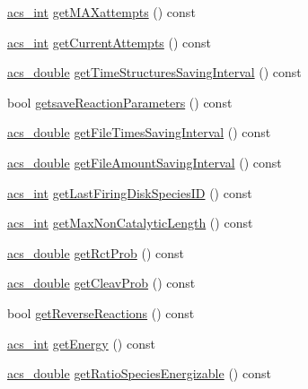 \begin{DoxyCompactItemize}
\item 
\hyperlink{a00024_a8d277355641a098190360234e2ebde35}{acs\-\_\-int} \hyperlink{a00011_ae626b961a53eeb5e08b4190da235e8dd}{get\-M\-A\-Xattempts} () const 
\item 
\hyperlink{a00024_a8d277355641a098190360234e2ebde35}{acs\-\_\-int} \hyperlink{a00011_a0851e3481e6fec7f4feef126d5a6704c}{get\-Current\-Attempts} () const 
\item 
\hyperlink{a00024_ab776853a005fcbf56af0424a2a4dd607}{acs\-\_\-double} \hyperlink{a00011_a892dd7bd29342c4206c39556d91a83da}{get\-Time\-Structures\-Saving\-Interval} () const 
\item 
bool \hyperlink{a00011_a19f10c43e263fbc167bbd4cc760c92ff}{getsave\-Reaction\-Parameters} () const 
\item 
\hyperlink{a00024_ab776853a005fcbf56af0424a2a4dd607}{acs\-\_\-double} \hyperlink{a00011_a77e995bee54ab4e09f165a857a7b0272}{get\-File\-Times\-Saving\-Interval} () const 
\item 
\hyperlink{a00024_ab776853a005fcbf56af0424a2a4dd607}{acs\-\_\-double} \hyperlink{a00011_adf74cb3545d95a7965e3a18cfc98cebe}{get\-File\-Amount\-Saving\-Interval} () const 
\item 
\hyperlink{a00024_a8d277355641a098190360234e2ebde35}{acs\-\_\-int} \hyperlink{a00011_a984f79e5f89b774b65db901899687ac0}{get\-Last\-Firing\-Disk\-Species\-I\-D} () const 
\item 
\hyperlink{a00024_a8d277355641a098190360234e2ebde35}{acs\-\_\-int} \hyperlink{a00011_aca760caf9354f541020c1db58490b18f}{get\-Max\-Non\-Catalytic\-Length} () const 
\item 
\hyperlink{a00024_ab776853a005fcbf56af0424a2a4dd607}{acs\-\_\-double} \hyperlink{a00011_ae244aa972cf10c103b8b20d95703831f}{get\-Rct\-Prob} () const 
\item 
\hyperlink{a00024_ab776853a005fcbf56af0424a2a4dd607}{acs\-\_\-double} \hyperlink{a00011_ac728f6ab012c42fa85a2e2f70df7dc58}{get\-Cleav\-Prob} () const 
\item 
bool \hyperlink{a00011_a2a2ac2a8140df67688a71d3349adf04a}{get\-Reverse\-Reactions} () const 
\item 
\hyperlink{a00024_a8d277355641a098190360234e2ebde35}{acs\-\_\-int} \hyperlink{a00011_ab463a460de102c79c1044ab8a2c176ae}{get\-Energy} () const 
\item 
\hyperlink{a00024_ab776853a005fcbf56af0424a2a4dd607}{acs\-\_\-double} \hyperlink{a00011_a4fcc6030b68a37bedff870b9c48c188d}{get\-Ratio\-Species\-Energizable} () const 
\item 

\end{DoxyCompactItemize}
